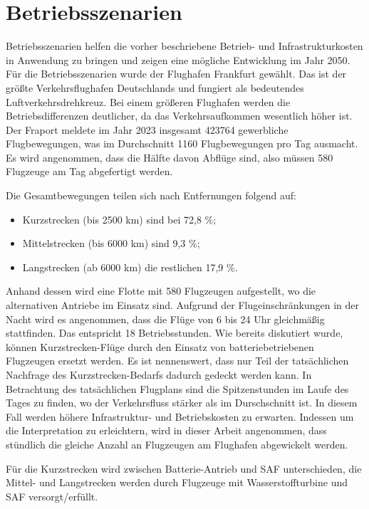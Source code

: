 
\section{Betriebsszenarien}
\label{s:Betriebsszenarien}
Betriebsszenarien helfen die vorher beschriebene Betrieb- und Infrastrukturkosten in Anwendung zu bringen und zeigen 
eine mögliche Entwicklung im Jahr 2050.
Für die Betriebsszenarien wurde der Flughafen Frankfurt gewählt. 
Das ist der größte Verkehrsflughafen Deutschlands und fungiert als bedeutendes Luftverkehrsdrehkreuz. 
Bei einem größeren Flughafen werden die Betriebsdifferenzen deutlicher, da das Verkehrsaufkommen wesentlich höher ist.
Der Fraport meldete im Jahr 2023 insgesamt 423764 gewerbliche Flugbewegungen, was im Durchschnitt 1160 Flugbewegungen pro Tag ausmacht. 
Es wird angenommen, dass die Hälfte davon Abflüge sind, also müssen 580 Flugzeuge am Tag abgefertigt werden.

Die Gesamtbewegungen teilen sich nach Entfernungen folgend auf:
\begin{itemize}
    \item Kurzstrecken (bis 2500 km) sind bei 72,8 \%;
    \item Mittelstrecken (bis 6000 km) sind 9,3 \%;
    \item Langstrecken (ab 6000 km) die restlichen 17,9 \%. 
    \end{itemize}
	
Anhand dessen wird eine Flotte mit 580 Flugzeugen aufgestellt, wo die alternativen Antriebe im Einsatz sind.
Aufgrund der Flugeinschränkungen in der Nacht wird es angenommen, dass die Flüge von 6 bis 24 Uhr gleichmäßig stattfinden. 
Das entspricht 18 Betriebsstunden.
Wie bereits diskutiert wurde, können Kurzstrecken-Flüge durch den Einsatz von batteriebetriebenen Flugzeugen ersetzt werden. 
Es ist nennenswert, dass nur Teil der tatsächlichen Nachfrage des Kurzstrecken-Bedarfs dadurch gedeckt werden kann. 
In Betrachtung des tatsächlichen Flugplans sind die Spitzenstunden im Laufe des Tages zu finden, wo
der Verkehrsfluss stärker als im Durschschnitt ist. In diesem Fall werden höhere Infrastruktur- und Betriebskosten zu erwarten.
Indessen um die Interpretation zu erleichtern, wird in dieser Arbeit angenommen, dass stündlich die gleiche Anzahl an Flugzeugen 
am Flughafen abgewickelt werden. 

Für die Kurzstrecken wird zwischen Batterie-Antrieb und SAF unterschieden, 
die Mittel- und Langstrecken werden durch Flugzeuge mit Wasserstoffturbine und SAF versorgt/erfüllt.

